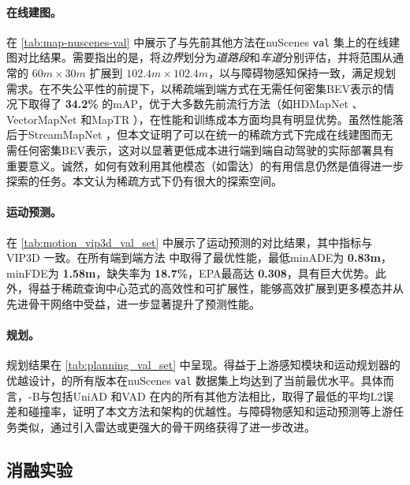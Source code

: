 

\paragraph{\textbf{在线建图。}} 在 \cref{tab:map-nuscenes-val} 中展示了\model 与先前其他方法在nuScenes \texttt{val} 集上的在线建图对比结果。需要指出的是，将\textit{边界}划分为\textit{道路段}和\textit{车道}分别评估，并将范围从通常的 $60m \times 30m$ 扩展到 $102.4m \times 102.4m$，以与障碍物感知保持一致，满足规划需求。在不失公平性的前提下，\model 以稀疏端到端方式在无需任何密集BEV表示的情况下取得了 \textbf{34.2\%} 的mAP，优于大多数先前流行方法（如HDMapNet \cite{li2022hdmapnet}、VectorMapNet \cite{liu2023vectormapnet} 和MapTR \cite{liao2022maptr}），在性能和训练成本方面均具有明显优势。虽然性能落后于StreamMapNet \cite{yuan2024streammapnet}，但本文证明了可以在统一的稀疏方式下完成在线建图而无需任何密集BEV表示，这对以显著更低成本进行端到端自动驾驶的实际部署具有重要意义。诚然，如何有效利用其他模态（如雷达）的有用信息仍然是值得进一步探索的任务。本文认为稀疏方式下仍有很大的探索空间。

\paragraph{\textbf{运动预测。}} 在 \cref{tab:motion_vip3d_val_set} 中展示了运动预测的对比结果，其中指标与VIP3D \cite{gu2023vip3d} 一致。\model 在所有端到端方法 \cite{liang2020pnpnet, gu2023vip3d, hu2023planning} 中取得了最优性能，最低minADE为 \textbf{0.83m}，minFDE为 \textbf{1.58m}，缺失率为 \textbf{18.7\%}，EPA最高达 \textbf{0.308}，具有巨大优势。此外，得益于稀疏查询中心范式的高效性和可扩展性，\model 能够高效扩展到更多模态并从先进骨干网络中受益，进一步显著提升了预测性能。



\paragraph{\textbf{规划。}} 规划结果在 \cref{tab:planning_val_set} 中呈现。得益于上游感知模块和运动规划器的优越设计，\model 的所有版本在nuScenes \texttt{val} 数据集上均达到了当前最优水平。具体而言，\model-B与包括UniAD\cite{hu2023planning} 和VAD\cite{jiang2023vad} 在内的所有其他方法相比，取得了最低的平均L2误差和碰撞率，证明了本文方法和架构的优越性。与障碍物感知和运动预测等上游任务类似，\model 通过引入雷达或更强大的骨干网络获得了进一步改进。

\subsection{消融实验}

